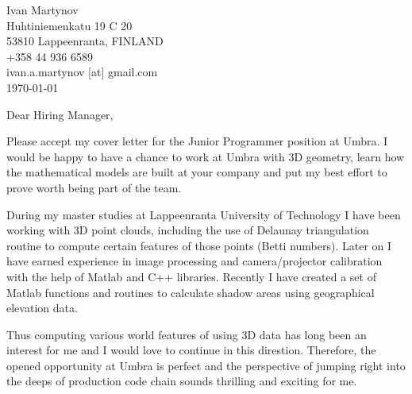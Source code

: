 \documentclass[]{article}
\begin{document}
\begin{flushright}
	Ivan Martynov\\
  Huhtiniemenkatu 19 C 20\\
	53810 Lappeenranta, FINLAND\\
	+358 44 936 6589\\
	ivan.a.martynov [at] gmail.com\\
	\today
\end{flushright}



\noindent
Dear Hiring Manager,
\bigskip

\noindent
Please accept my cover letter for the Junior Programmer position at Umbra.
I would be happy to have a chance to work at Umbra with 3D geometry, learn how
the mathematical models are built at your company and put my best effort to
prove worth being part of the team.

During my master studies at Lappeenranta University of Technology I have been
working with 3D point clouds, including the use of Delaunay triangulation
routine to compute certain features of those points (Betti numbers). Later on I
have earned experience in image processing and camera/projector calibration
with the help of Matlab and C++ libraries. Recently I have created a set of
Matlab functions and routines to calculate shadow areas using geographical
elevation data.

Thus computing various world features of using 3D data has long been an
interest for me and I would love to continue in this direstion. Therefore, the
opened opportunity at Umbra is perfect and the perspective of jumping right
into the deeps of production code chain sounds thrilling and exciting for me.

\end{document}
